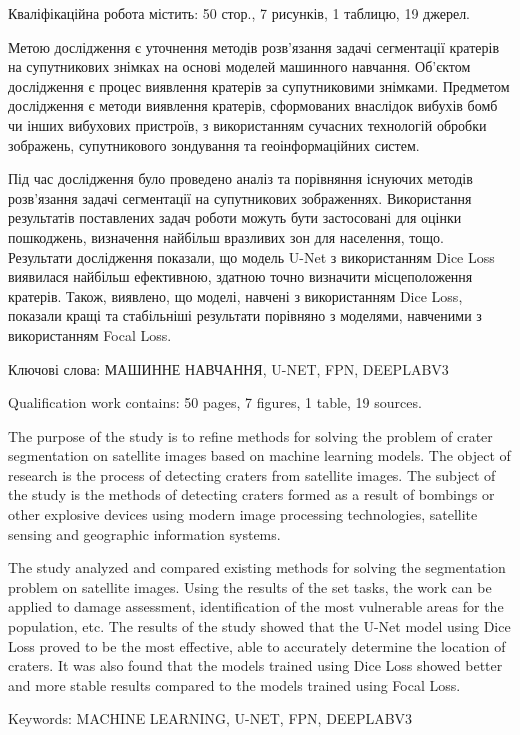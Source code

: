 
\abstractUkr

Кваліфікаційна робота містить: 50 стор., 7 рисунків, 1 таблицю, 19 джерел.

Метою дослідження є уточнення методів
розв'язання задачі сегментації кратерів на супутникових знімках
на основі моделей машинного навчання.
Об'єктом дослідження є процес виявлення кратерів за супутниковими знімками.
Предметом дослідження є методи виявлення кратерів, сформованих
внаслідок вибухів бомб чи інших вибухових пристроїв, з використанням
сучасних технологій обробки зображень, супутникового зондування та
геоінформаційних систем.

Під час дослідження було проведено аналіз та порівняння
існуючих методів розв'язання задачі сегментації на супутникових
зображеннях. Використання результатів поставлених задач роботи
можуть бути застосовані для оцінки пошкоджень, визначення
найбільш вразливих зон для населення, тощо. Результати
дослідження показали, що модель U-Net з використанням Dice
Loss виявилася найбільш ефективною, здатною точно визначити
місцеположення кратерів. Також, виявлено, що моделі, навчені з
використанням Dice Loss, показали кращі та стабільніші результати
порівняно з моделями, навченими з використанням Focal Loss.

Ключові слова: \MakeUppercase{машинне навчання, u-net, fpn, deeplabv3}

%

\abstractEng

Qualification work contains: 50 pages, 7 figures, 1 table, 19 sources.

The purpose of the study is to refine methods for solving the problem of crater
segmentation on satellite images based on machine learning models. The object
of research is the process of detecting craters from satellite images. The
subject of the study is the methods of detecting craters formed as a result of
bombings or other explosive devices using modern image processing technologies,
satellite sensing and geographic information systems.

The study analyzed and compared existing methods for solving the segmentation
problem on satellite images. Using the results of the set tasks, the work can
be applied to damage assessment, identification of the most vulnerable areas
for the population, etc. The results of the study showed that the U-Net model
using Dice Loss proved to be the most effective, able to accurately determine
the location of craters. It was also found that the models trained using Dice
Loss showed better and more stable results compared to the models trained using
Focal Loss.

Keywords: \MakeUppercase{machine learning, u-net, fpn, deeplabv3}

\clearpage